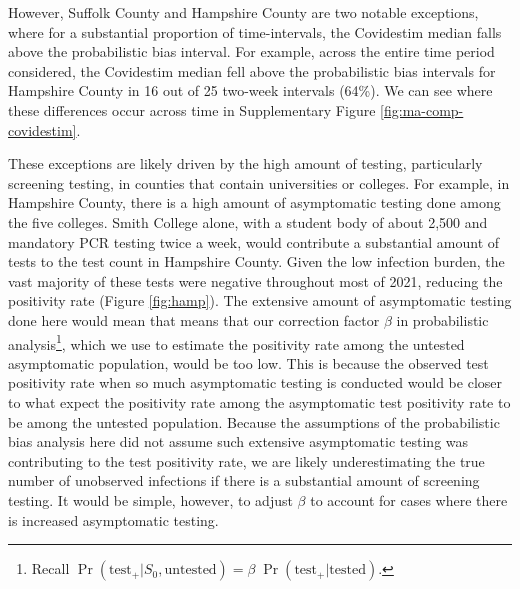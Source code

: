 \documentclass[12pt,twoside]{smiththesis}
\begin{document}
However, Suffolk County and Hampshire County are two notable exceptions, where for a substantial proportion of time-intervals, the Covidestim median falls above the probabilistic bias interval. For example, across the entire time period considered, the Covidestim median fell above the probabilistic bias intervals for Hampshire County in 16 out of 25 two-week intervals (64\%). We can see where these differences occur across time in Supplementary Figure \ref{fig:ma-comp-covidestim}.

These exceptions are likely driven by the high amount of testing, particularly screening testing, in counties that contain universities or colleges. For example, in Hampshire County, there is a high amount of asymptomatic testing done among the five colleges. Smith College alone, with a student body of about 2,500 and mandatory PCR testing twice a week, would contribute a substantial amount of tests to the test count in Hampshire County. Given the low infection burden, the vast majority of these tests were negative throughout most of 2021, reducing the positivity rate (Figure \ref{fig:hamp}). The extensive amount of asymptomatic testing done here would mean that
means that our correction factor \(\beta\) in probabilistic analysis\footnote{Recall \(\Pr(\text{test}_+ | S_0, \text{untested}) = \beta \; \Pr(\text{test}_+|\text{tested})\).}, which we use to estimate the positivity rate among the untested asymptomatic population, would be too low. This is because the observed test positivity rate when so much asymptomatic testing is conducted would be closer to what expect the positivity rate among the asymptomatic test positivity rate to be among the untested population. Because the assumptions of the probabilistic bias analysis here did not assume such extensive asymptomatic testing was contributing to the test positivity rate, we are likely underestimating the true number of unobserved infections if there is a substantial amount of screening testing. It would be simple, however, to adjust \(\beta\) to account for cases where there is increased asymptomatic testing.
\end{document}
